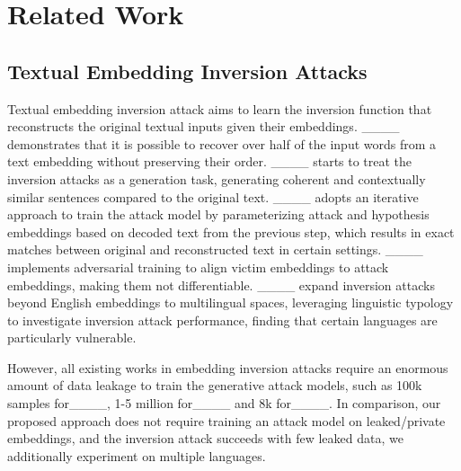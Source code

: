 \section{Related Work}
\subsection{Textual Embedding Inversion Attacks}
Textual embedding inversion attack aims to learn the inversion function that reconstructs the original textual inputs given their embeddings. 
____ demonstrates that it is possible to recover over half of the input words from a text embedding without preserving their order.
____ starts to treat the inversion attacks as a generation task, generating coherent and contextually similar sentences compared to the original text.
____ adopts an iterative approach to train the attack model by parameterizing attack and hypothesis embeddings based on decoded text from the previous step, which results in exact matches between original and reconstructed text in certain settings. 
____ implements adversarial training to align victim embeddings to attack embeddings, making them not differentiable. 
____ expand inversion attacks beyond English embeddings to multilingual spaces, leveraging linguistic typology to investigate inversion attack performance, finding that certain languages are particularly vulnerable.

However, all existing works in embedding inversion attacks require an enormous amount of data leakage to train the generative attack models, such as 100k samples for____, 1-5 million for____ and 8k for____.
In comparison, our proposed approach \textbf{\ourmethod} does not require training an attack model on leaked/private embeddings, and the inversion attack succeeds with few leaked data, we additionally experiment on multiple languages.

